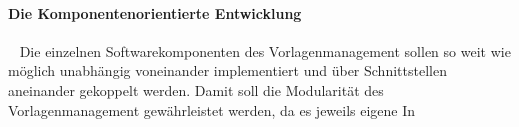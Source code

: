\paragraph{Die Komponentenorientierte Entwicklung}
\ \newline
Die einzelnen Softwarekomponenten des Vorlagenmanagement sollen so weit wie möglich unabhängig voneinander implementiert und über Schnittstellen aneinander gekoppelt werden. Damit soll die Modularität des Vorlagenmanagement gewährleistet werden, da es jeweils eigene In